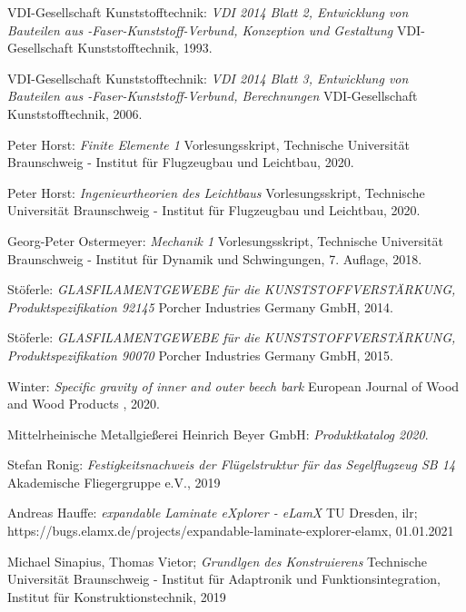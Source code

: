 \begin{thebibliography}{99}
	VDI-Gesellschaft Kunststofftechnik:
	\textit{VDI 2014 Blatt 2, Entwicklung von Bauteilen aus -Faser-Kunststoff-Verbund, Konzeption und Gestaltung}
	VDI-Gesellschaft Kunststofftechnik, 1993.
	
	VDI-Gesellschaft Kunststofftechnik:
	\textit{VDI 2014 Blatt 3, Entwicklung von Bauteilen aus -Faser-Kunststoff-Verbund, Berechnungen}
	VDI-Gesellschaft Kunststofftechnik, 2006.
	
	Peter Horst:
	\textit{Finite Elemente 1}
	Vorlesungsskript, Technische Universität Braunschweig - Institut für Flugzeugbau und Leichtbau, 2020.
	
	Peter Horst:
	\textit{Ingenieurtheorien des Leichtbaus}
	Vorlesungsskript, Technische Universität Braunschweig - Institut für Flugzeugbau und Leichtbau, 2020.
	
	Georg-Peter Ostermeyer:
	\textit{Mechanik 1}
	Vorlesungsskript, Technische Universität Braunschweig - Institut für Dynamik und Schwingungen, 7. Auflage, 2018.
	
	Stöferle:
	\textit{GLASFILAMENTGEWEBE für die KUNSTSTOFFVERSTÄRKUNG, Produktspezifikation 92145}
	Porcher Industries Germany GmbH, 2014.
	
	Stöferle:
	\textit{GLASFILAMENTGEWEBE für die KUNSTSTOFFVERSTÄRKUNG, Produktspezifikation 90070}
	Porcher Industries Germany GmbH, 2015.
	
	Winter:
	\textit{Specific gravity of inner and outer beech bark}
	European Journal of Wood and Wood Products , 2020.
	
	Mittelrheinische Metallgießerei Heinrich Beyer GmbH:
	\textit{Produktkatalog 2020}.
	
	Stefan Ronig:
	\textit{Festigkeitsnachweis der Flügelstruktur für das Segelflugzeug SB 14}
	Akademische Fliegergruppe e.V., 2019
	
	Andreas Hauffe:
	\textit{expandable Laminate eXplorer - eLamX} TU Dresden, ilr;
	https://bugs.elamx.de/projects/expandable-laminate-explorer-elamx, 01.01.2021
	
	Michael Sinapius, Thomas Vietor;
	\textit{Grundlgen des Konstruierens}	
	Technische Universität Braunschweig - Institut für Adaptronik und Funktionsintegration, Institut für Konstruktionstechnik, 2019
\end{thebibliography}
\endgroup